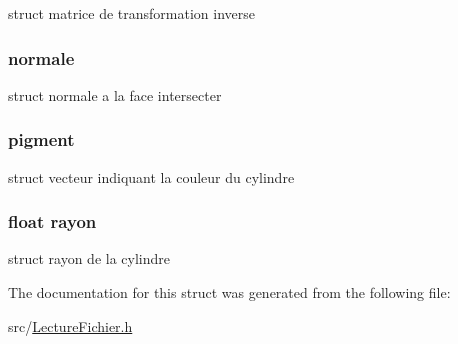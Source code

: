 \label{structcylinder_acd7a3590501dcccfaefccbb658f83821}
struct matrice de transformation inverse \hypertarget{structcylinder_a944738f40a0294270a0047acc5a77ee2}{
\subsubsection[{normale}]{ {\bf normale}}}
\label{structcylinder_a944738f40a0294270a0047acc5a77ee2}
struct normale a la face intersecter \hypertarget{structcylinder_a5a4ee24431a1811fa1c8b75844198987}{
\subsubsection[{pigment}]{ {\bf pigment}}}
\label{structcylinder_a5a4ee24431a1811fa1c8b75844198987}
struct vecteur indiquant la couleur du cylindre \hypertarget{structcylinder_aa23f7a160698c954b6073da64f9bd3f0}{
\subsubsection[{rayon}]{\setlength{\rightskip}{0pt plus 5cm}float {\bf rayon}}}
\label{structcylinder_aa23f7a160698c954b6073da64f9bd3f0}
struct rayon de la cylindre 

The documentation for this struct was generated from the following file:\begin{DoxyCompactItemize}
\item 
src/\hyperlink{_lecture_fichier_8h}{LectureFichier.h}\end{DoxyCompactItemize}
